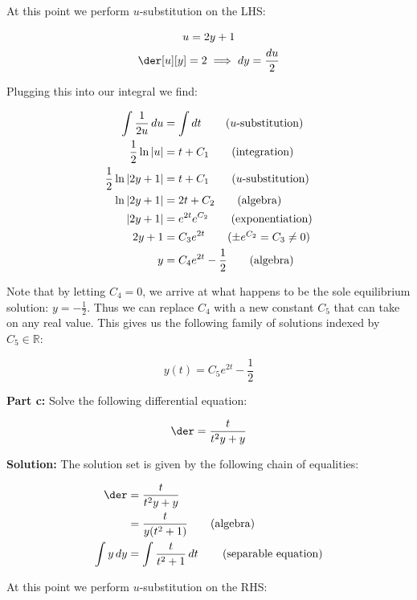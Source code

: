 \documentclass{article}
\begin{document}
At this point we perform $u$-substitution on the LHS:

\begin{gather*}
    u=2y+1\\
    \der[u][y]=2\implies dy=\frac{du}{2}
\end{gather*}

Plugging this into our integral we find:

\begin{align*}
    \int \frac{1}{2u}\mathop{du}&=\int\mathop{dt}\tag{$u$-substitution}\\
    \frac{1}{2}\ln{|u|}&=t+C_1\tag{integration}\\
    \frac{1}{2}\ln{|2y+1|}&=t+C_1\tag{$u$-substitution}\\
    \ln{|2y+1|}&=2t+C_2\tag{algebra}\\
    |2y+1|&=e^{2t}e^{C_2}\tag{exponentiation}\\
    2y+1&=C_3e^{2t}\tag{$\pm e^{C_2}=C_3\not=0$}\\
    y&=C_4e^{2t}-\frac{1}{2}\tag{algebra}
\end{align*}

Note that by letting $C_4=0$, we arrive at what happens to be the sole equilibrium solution: $y=-\frac{1}{2}$. Thus we can replace $C_4$ with a new constant $C_5$ that can take on any real value. This gives us the following family of solutions indexed by $C_5\in\mathbb R$:

\begin{equation*}
    y(t)=C_5e^{2t}-\frac{1}{2}
\end{equation*}
\smallskip

\noindent\textbf{Part c:} Solve the following differential equation:

\begin{equation*}
    \der=\frac{t}{t^2y+y}
\end{equation*}
\smallskip

\noindent\textbf{Solution:} The solution set is given by the following chain of equalities:

\begin{align*}
    \der&=\frac{t}{t^2y+y}\\
    &=\frac{t}{y(t^2+1)}\tag{algebra}\\
    \int y\mathop{dy}&=\int \frac{t}{t^2+1}\mathop{dt}\tag{separable equation}\\
\end{align*}

At this point we perform $u$-substitution on the RHS:
\end{document}
